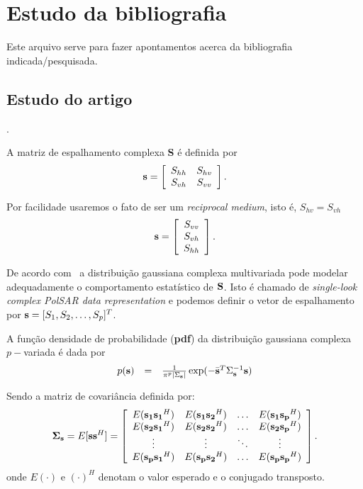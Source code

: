 \documentclass[12pt,a4paper]{article}
\begin{document}
\section{Estudo da bibliografia}

Este arquivo serve para fazer apontamentos acerca da bibliografia indicada/pesquisada.

\subsection{Estudo do artigo~\cite{lee94}}.

A matriz de espalhamento complexa {\bf S} é definida por
$$
{\bf s} = \left[
\begin{array}{cc}
	S_{hh}   & S_{hv}   \\
	S_{vh}   & S_{vv}   \\
\end{array}
\right].
$$

Por facilidade usaremos o fato de ser um {\it reciprocal medium}, isto é, $S_{hv}=S_{vh}$
$$
{\bf s} = \left[
\begin{array}{c}
	S_{vv}      \\
	S_{vh}     \\
	S_{hh}      \\
\end{array}
\right].
$$

De acordo com~\cite{goodman1963} a distribuição gaussiana complexa multivariada pode modelar adequadamente o comportamento estatístico de $\bf S$. Isto é chamado de {\it single-look complex PolSAR data representation} e podemos definir o vetor de espalhamento por ${\bf s}=[S_1,S_2,\dots,S_p]^T$. 

A função densidade de probabilidade ({\bf pdf}) da distribuição gaussiana complexa $p-$variada é dada por
\begin{equation}\label{sec1eqn1}
\begin{array}{ccc}
	p({\bf s})&=&\frac{1}{\pi^p|\Sigma_{{\bf s}}|}\exp(-\bar{{\bf s}}^{T}\Sigma_{{\bf s}}^{-1}{\bf s})  \\
\end{array}
\end{equation}

Sendo a matriz de covariância definida por:
\begin{equation}\label{sec1eqn2}
	{\bf \Sigma_{{\bf s}}} = E[{\bf s}{\bf s}^H] = \left[
\begin{array}{cccc}
	E({\bf s_1}{\bf s_1}^H)  & E({\bf s_1}{\bf s_2}^H) &\hdots & E({\bf s_1}{\bf s_p}^H) \\
	E({\bf s_2}{\bf s_1}^H)  & E({\bf s_2}{\bf s_2}^H) &\hdots &E({\bf s_2}{\bf s_p}^H)\\
        \vdots&\vdots &\ddots &\vdots\\
	E({\bf s_p}{\bf s_1}^H)  & E({\bf s_p}{\bf s_2}^H) &\hdots &E({\bf s_p}{\bf s_p}^H)\\
\end{array}
\right].
\end{equation}
onde $E(\cdot)$ e $(\cdot)^H$ denotam o valor esperado e o conjugado transposto.
\end{document}
